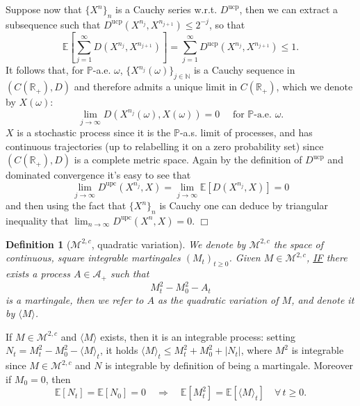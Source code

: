 \documentclass{article}
\newcommand{\emph}[1]{{\em #1\/}}
\newcommand{\textbf}[1]{\text{{\bfseries{#1}}}}
\newenvironment{proof}{\noindent\textbf{Proof\ }}{\hspace*{\fill}$\Box$\medskip}
\newtheorem{definition}{Definition}
{\theorembodyfont{\rmfamily}\newtheorem{example}{Example}}
\newcommand{\1}{\1}
\begin{document}
{\begin{proof}
  Suppose now that $\{ X^n \}_n$ is a Cauchy series w.r.t. $D^{\operatorname{ucp}}$,
  then we can extract a subsequence such that $D^{\operatorname{ucp}} (X^{n_j},
  X^{n_{j + 1}}) \leqslant 2^{- j}$, so that
  \[ \mathbb{E} \left[ \sum_{j = 1}^{\infty} D (X^{n_j}, X^{n_{j + 1}})
     \right] = \sum_{j = 1}^{\infty} D^{\operatorname{ucp}} (X^{n_j}, X^{n_{j + 1}})
     \leqslant 1. \]
  It follows that, for $\mathbb{P}$-a.e. $\omega$, $\{ X^{n_j} (\omega) \}_{j
  \in \mathbb{N}}$ is a Cauchy sequence in $(C (\mathbb{R}_+), D)$ and
  therefore admits a unique limit in $C (\mathbb{R}_+)$, which we denote by $X
  (\omega)$:
  \[ \lim_{j \rightarrow \infty} D (X^{n_j} (\omega), X (\omega)) = 0 \quad
     \text{ for } \mathbb{P} \text{-a.e. } \omega . \]
  $X$ is a stochastic process since it is the $\mathbb{P}$-a.s. limit of
  processes, and has continuous trajectories (up to relabelling it on a zero
  probability set) since $(C (\mathbb{R}_+), D)$ is a complete metric space.
  Again by the definition of $D^{\operatorname{ucp}}$ and dominated convergence it's
  easy to see that
  \[ \lim_{j \rightarrow \infty} D^{\operatorname{upc}} (X^{n_j}, X) = \lim_{j
     \rightarrow \infty} \mathbb{E} [D (X^{n_j}, X)] = 0 \]
  and then using the fact that $\{ X^n \}_n$ is Cauchy one can deduce by
  triangular inequality that $\lim_{n \rightarrow \infty} D^{\operatorname{upc}} (X^n,
  X) = 0$. 
\end{proof}

\begin{definition}[$\mathcal{M}^{2, c}$, quadratic variation]
  \label{defn:quadratic.variation}We denote by $\mathcal{M}^{2, c}$ the space
  of continuous, square integrable martingales $(M_t)_{t \geqslant 0}$. Given
  $M \in \mathcal{M}^{2, c}$, {\underline{IF}} there exists a process $A \in
  \mathcal{A}_+$ such that
  \[ M^2_t - M^2_0 - A_t \]
  is a martingale, then we refer to $A$ as the {\emph{quadratic variation}} of
  $M$, and denote it by $\langle M \rangle$.
\end{definition}

\begin{remark}
  \label{rem:qv.first.properties}If $M \in \mathcal{M}^{2, c}$ and $\langle M
  \rangle$ exists, then it is an integrable process: setting $N_t = M^2_t -
  M^2_0 - \langle M \rangle_t$, it holds $\langle M \rangle_t \leqslant M_t^2
  + M_0^2 + | N_t |$, where $M^2$ is integrable since $M \in \mathcal{M}^{2,
  c}$ and $N$ is integrable by definition of being a martingale. Moreover if
  $M_0 = 0$, then
  \[ \mathbb{E} [N_t] =\mathbb{E} [N_0] = 0 \quad \Rightarrow \quad \mathbb{E}
     [M_t^2] =\mathbb{E} [\langle M \rangle_t] \quad \forall \, t \geqslant 0.
  \]
\end{remark}

}
\end{document}
